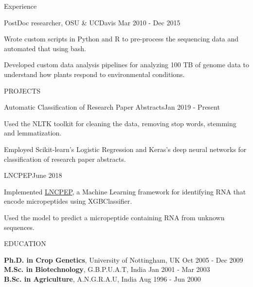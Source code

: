 \documentclass{resume} %
\begin{document}
\begin{rSection}{Experience }
\vspace{-4pt}

\begin{rSubsection}{PostDoc researcher, OSU \& UCDavis }{Mar 2010 - Dec 2015}{}    

\vspace{-3pt}

\item Wrote custom scripts in Python and R to pre-process the sequencing data and automated that using bash.
\item Developed custom data analysis pipelines for analyzing 100 TB of genome data to understand how plants respond to environmental conditions.
\end{rSubsection} 
 
\end{rSection}


\begin{rSection}{PROJECTS}

\begin{rSubsection}{Automatic Classification of Research Paper Abstracts}{Jan 2019 - Present}{} %

\vspace{-3pt}

\item Used the NLTK toolkit for cleaning the data, removing stop words, stemming and lemmatization. 
\item Employed Scikit-learn's Logistic Regression and Keras's deep neural networks for classification of research paper abstracts. \end{rSubsection} 

\begin{rSubsection}{LNCPEP}{June 2018}{} %

\vspace{-3pt}

\item Implemented \href{https://github.com/NCBI-Hackathons/LNCPEP}{LNCPEP}, a Machine Learning framework for identifying RNA that encode micropeptides using XGBClassifier. 
\item Used the model to predict a micropeptide containing RNA from unknown sequences.
\end{rSubsection} 

\end{rSection}



\begin{rSection}{EDUCATION}

{\textbf{Ph.D. in Crop Genetics}, University of Nottingham, UK} \hfill {Oct 2005 - Dec 2009}
\\
{\textbf{M.Sc. in Biotechnology}, G.B.P.U.A.T, India} \hfill {Jan 2001 - Mar 2003}
\\
{\textbf{B.Sc. in Agriculture}, A.N.G.R.A.U, India} \hfill {Aug 1996 - Jun 2000}

\end{rSection} 

\end{document}
